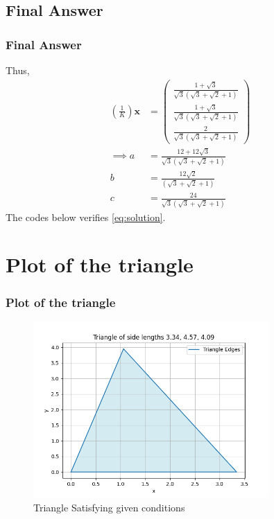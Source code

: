 \documentclass{beamer}
\providecommand{\brak}[1]{\ensuremath{\left(#1\right)}}
\theoremstyle{remark}
\newcommand{\myvec}[1]{\ensuremath{\begin{pmatrix}#1\end{pmatrix}}}
\let\vec\mathbf
\numberwithin{equation}{section}
\begin{document}
\subsection{Final Answer}
\begin{frame}[fragile]
\frametitle{Final Answer}

Thus, 
\begin{align}
\label{eq:solution}
\brak{\frac{1}{K}}\vec{x}&=\myvec{\frac{1+\sqrt{3}}{\sqrt{3}\brak{\sqrt{3}+\sqrt{2}+1}}\\\frac{1+\sqrt{3}}{\sqrt{3}\brak{\sqrt{3}+\sqrt{2}+1}}\\\frac{2}{\sqrt{3}\brak{\sqrt{3}+\sqrt{2}+1}}}
\\
\implies a&=\frac{12+12\sqrt{3}}{\sqrt{3}\brak{\sqrt{3}+\sqrt{2}+1}}\\
b&=\frac{12\sqrt{2}}{\brak{\sqrt{3}+\sqrt{2}+1}}\\
c&=\frac{24}{\sqrt{3}\brak{\sqrt{3}+\sqrt{2}+1}}
\end{align}
%
The codes below verifies \eqref{eq:solution}.
\end{frame}
\section{Plot of the triangle}
\begin{frame}
\frametitle{Plot of the triangle}
\begin{figure}[H]
    \centering
	\includegraphics[width=0.8\textwidth]{figs/fig.png}
    \caption{Triangle Satisfying given conditions}
    \end{figure}   
\end{frame}
\end{document}
